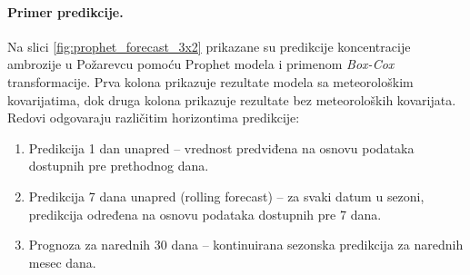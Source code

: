\documentclass[12pt]{article}
\begin{document}
\begin{table}[h!]
\centering
\caption{Prophet – početak sezone polena: stvarni datum i predikcija 7 dana unapred.}
\label{tab:prophet_start_season}
\end{table}

\paragraph{\textbf{Primer predikcije.}}  
Na slici \ref{fig:prophet_forecast_3x2} prikazane su predikcije koncentracije ambrozije u Požarevcu pomoću Prophet modela i primenom \textit{Box-Cox} transformacije.  
Prva kolona prikazuje rezultate modela sa meteorološkim kovarijatima, dok druga kolona prikazuje rezultate bez meteoroloških kovarijata.  
Redovi odgovaraju različitim horizontima predikcije:  
\begin{enumerate}
    \item Predikcija 1 dan unapred – vrednost predviđena na osnovu podataka dostupnih pre prethodnog dana.
    \item Predikcija 7 dana unapred (rolling forecast) – za svaki datum u sezoni, predikcija određena na osnovu podataka dostupnih pre 7 dana.
    \item Prognoza za narednih 30 dana – kontinuirana sezonska predikcija za narednih mesec dana.
\end{enumerate}
\end{document}
